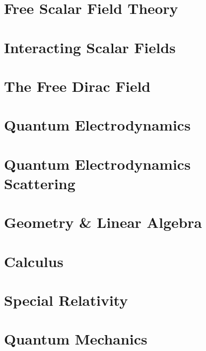 \documentclass{momento}
\begin{document}


\chapter{Free Scalar Field Theory}
\label{cha:free-scalar-field}



\chapter{Interacting Scalar Fields}
\label{cha:inter-scal-fields}


\chapter{The Free Dirac Field}
\label{cha:free-dirac-field}


\chapter{Quantum Electrodynamics}
\label{cha:quant-electr}

\chapter{Quantum Electrodynamics Scattering}
\label{cha:quant-electr-scatt}

\appendices \twocolumn

\chapter{Geometry \& Linear Algebra}
\label{cha:linearalgebra}



\chapter{Calculus}
\label{cha:calculus}

%

\chapter{Special Relativity}
\label{cha:specialrelativity}



\chapter{Quantum Mechanics}
\label{cha:quantummechanics}


\end{document}
